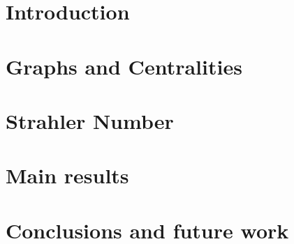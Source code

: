 \documentclass[a4paper,UKenglish]{lipics-v2021}
\begin{document}
	
	\maketitle
	
	
	
	\section{Introduction}\label{sec:introduction}
	
	
	
	\section{Graphs and Centralities}\label{sec:Graphs and Centralities}
	
		\section{Strahler Number}
	\label{sec:Strahler Number}
		

	\section{Main results}\label{sec:results}
	
	
	
	\newpage
	
	\section{Conclusions and future work}\label{sec:Conclusions and future work}
	
	
	
	\newpage
	
	
	
	\newpage
	\appendix
	
	
\end{document}
